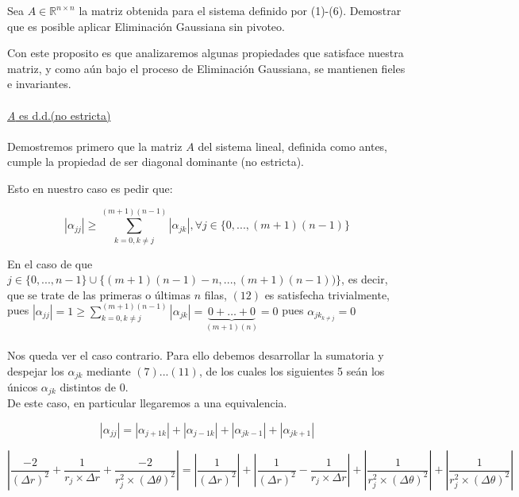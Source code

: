 \begin{proposition}
Sea $A \in \mathbb{R}^{n \times n}$ la matriz obtenida para el sistema definido por (1)-(6). Demostrar que es posible
aplicar Eliminaci\'on Gaussiana sin pivoteo.
\end{proposition}

Con este proposito es que analizaremos algunas propiedades que satisface nuestra matriz, y como a\'un bajo el proceso de Eliminaci\'on Gaussiana, se mantienen fieles e invariantes.
\\
\\
\underline{\textit{A} es d.d.(no estricta)}
\\
\\
Demostremos primero que la matriz $A$ del sistema lineal, definida como antes, cumple la propiedad de ser diagonal dominante (no estricta).

Esto en nuestro caso es pedir que:

\begin{equation}
 \left | \alpha_{jj} \right | \geq \sum_{k=0,k \neq j}^{(m+1)(n-1)} \left | \alpha_{jk} \right |, \forall j \in \{ 0,...,(m+1)(n-1)\}
\end{equation}

En el caso de que $j \in \{0,...,n-1\} \cup \{(m+1)(n-1)-n,...,(m+1)(n-1))\}$, es decir, que se trate de las primeras o \'ultimas $n$ filas, $(12)$ es satisfecha trivialmente, pues  $\left | \alpha_{jj} \right | = 1 \geq \sum_{k=0,k \neq j}^{(m+1)(n-1)} \left | \alpha_{jk} \right | =  \underbrace{0+ \ldots +0}_{(m+1)(n)} = 0$ pues $\alpha_{jk_{k\neq j}}=0 $ 
\\
\\
Nos queda ver el caso contrario. Para ello debemos desarrollar la sumatoria y despejar los $\alpha_{jk}$ mediante $(7)...(11)$, de los cuales los siguientes 5 se\'an los \'unicos $\alpha_{jk}$ distintos de $0$.
\\
De este caso, en particular llegaremos a una equivalencia.

\begin{equation}
 \left | \alpha_{jj} \right | = \left | \alpha_{j+1k} \right | + \left | \alpha_{j-1k} \right | + \left | \alpha_{jk-1} \right | + \left | \alpha_{jk+1} \right |
\end{equation}

\begin{equation}
 \left | \frac{-2}{(\Delta r)^2} + \frac{1}{r_j \times \Delta r} + \frac{-2}{r_j^2 \times (\Delta \theta)^2} \right | = \left | \frac{1}{(\Delta r)^2} \right | + \left | \frac{1}{(\Delta r)^2} - \frac{1}{r_j \times \Delta r} \right | + \left | \frac{1}{r_j^2 \times (\Delta \theta)^2} \right | + \left | \frac{1}{r_j^2 \times (\Delta \theta)^2} \right |
\end{equation}

